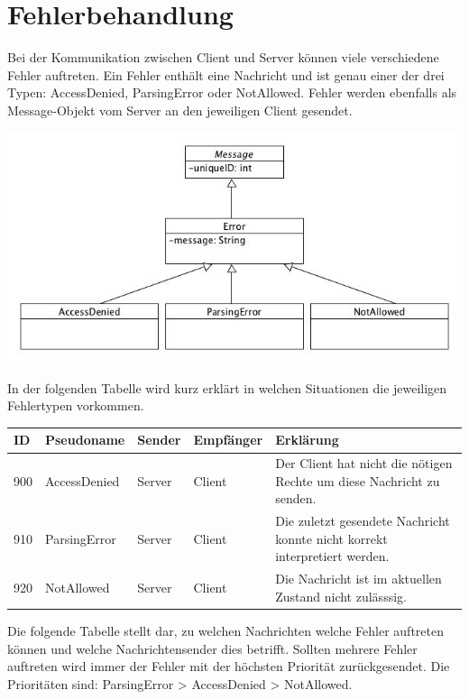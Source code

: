 \documentclass[a4paper, 10pt]{article}
\begin{document}
\newpage
\section{Fehlerbehandlung}
\label{sec:fehlerbehandlung}
Bei der Kommunikation zwischen Client und Server können viele verschiedene Fehler auftreten.
Ein Fehler enthält eine Nachricht und ist genau einer der drei Typen: AccessDenied, ParsingError oder NotAllowed. Fehler werden ebenfalls als Message-Objekt vom Server an den jeweiligen Client gesendet.

\includegraphics[width=\textwidth]{media/ClassError}

In der folgenden Tabelle wird kurz erklärt in welchen Situationen die jeweiligen Fehlertypen vorkommen.
\begin{center}
	\begin{tabular}{| l | l | p{2.5cm} | p{2.5cm} | p{6cm} |}
		\hline
			ID & Pseudoname & Sender & Empfänger & Erklärung \\
		\hline \hline
			900 & AccessDenied & Server & Client&
			Der Client hat nicht die nötigen Rechte um diese Nachricht zu senden. \\
		\hline
			910 & ParsingError & Server & Client &
			Die zuletzt gesendete Nachricht konnte nicht korrekt interpretiert werden.\\
		\hline
			920 & NotAllowed & Server & Client &
            Die Nachricht ist im aktuellen Zustand nicht zulässsig. \\
		\hline
	\end{tabular}
\end{center}

\newpage
Die folgende Tabelle stellt dar, zu welchen Nachrichten welche Fehler auftreten können und welche Nachrichtensender dies betrifft. Sollten mehrere Fehler auftreten wird immer der Fehler mit der höchsten Priorität zurückgesendet.
Die Prioritäten sind: ParsingError > AccessDenied > NotAllowed. \\
\end{document}
